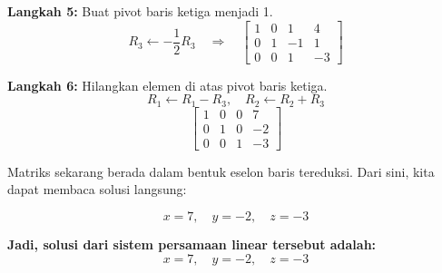 \documentclass{article}
\begin{document}
\textbf{Langkah 5:} Buat pivot baris ketiga menjadi 1.
\[
R_3 \leftarrow -\frac{1}{2} R_3
\quad \Rightarrow \quad
\left[\begin{array}{ccc|c}
1 & 0 & 1 & 4 \\
0 & 1 & -1 & 1 \\
0 & 0 & 1 & -3
\end{array}\right]
\]

\textbf{Langkah 6:} Hilangkan elemen di atas pivot baris ketiga.
\[
R_1 \leftarrow R_1 - R_3, \quad R_2 \leftarrow R_2 + R_3
\]
\[
\left[\begin{array}{ccc|c}
1 & 0 & 0 & 7 \\
0 & 1 & 0 & -2 \\
0 & 0 & 1 & -3
\end{array}\right]
\]

Matriks sekarang berada dalam bentuk eselon baris tereduksi. Dari sini, kita dapat membaca solusi langsung:

\[
x = 7, \quad y = -2, \quad z = -3
\]

\textbf{Jadi, solusi dari sistem persamaan linear tersebut adalah:}
\[
\boxed{x = 7, \quad y = -2, \quad z = -3}
\]
\end{document}
